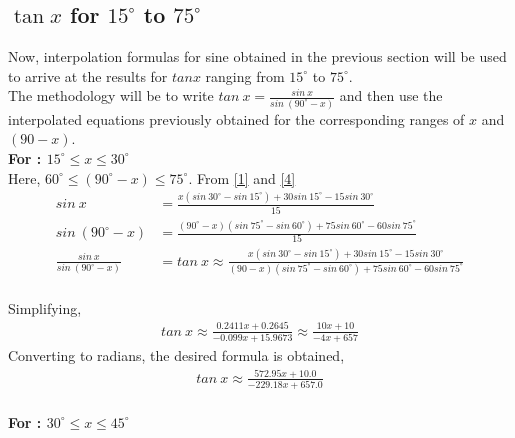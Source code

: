 \documentclass[12pt,twoside, letterpaper, margin=1in]{article}
\begin{document}
\subsection{\texorpdfstring{$\tan x$ for $15^\circ$ to $75^\circ$}{tan x for 15 degrees to 75 degrees}}

Now, interpolation formulas for sine obtained in the previous section will be used to arrive at the results for $tanx$ ranging from $15^\circ$ to $75^\circ$. \\
The methodology will be to write $tan~x=\frac{sin~x}{sin~(90^\circ-x)}$ and then use the interpolated equations previously obtained for the corresponding ranges of $x$ and $(90-x)$.\\
\textbf{For : $15^\circ \leq x \leq 30^\circ$ }\\
\vspace{1.5pt}
Here, $60^\circ \leq (90^\circ-x) \leq 75^\circ$. From \eqref{1} and \eqref{4}\\
\begin{align*}
sin~x &= \frac{x(sin~30^\circ - sin~15^\circ) + 30sin~15^\circ -15 sin~30^\circ}{15}\\
sin~(90^\circ-x) &= \frac{(90^\circ-x)(sin~75^\circ - sin~60^\circ) + 75sin~60^\circ -60 sin~75^\circ}{15}\\
\frac{sin~x}{sin~(90^\circ-x)}&=tan~x \approx \frac{x(sin~30^\circ - sin~15^\circ) + 30sin~15^\circ -15 sin~30^\circ}{(90-x)(sin~75^\circ - sin~60^\circ) + 75sin~60^\circ -60 sin~75^\circ}
\end{align*}
\\
\vspace{1.5pt}
Simplifying,
\\
\vspace{1.5pt}
\begin{align}
tan~x \approx  \frac{0.2411x+0.2645}{-0.099x+15.9673} \approx \frac{10x+10}{-4x+657} \label{5}
\end{align}
Converting to radians, the desired formula is obtained, 
\\
\vspace{1.5pt}
\begin{align}
tan~x \approx \frac{572.95 x + 10.0}{-229.18 x + 657.0}
\end{align}
\\
\textbf{For : $30^\circ \leq x \leq 45^\circ$ }\\
\vspace{1.5pt}
\end{document}
